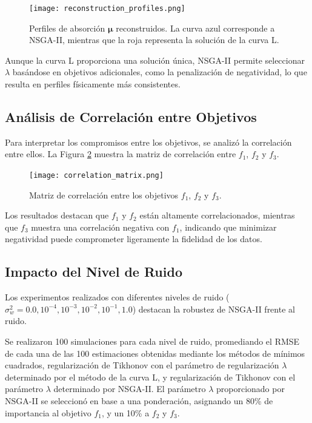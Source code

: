 \begin{figure}[h]
    \centering
    \texttt{[image: reconstruction\_profiles.png]}
    \caption{Perfiles de absorción \( \mathbf{\mu} \) reconstruidos. La curva azul corresponde a NSGA-II, mientras que la roja representa la solución de la curva L.}
    \label{fig:reconstruction_profiles}
\end{figure}

Aunque la curva L proporciona una solución única, NSGA-II permite seleccionar \( \lambda \) basándose en objetivos adicionales, como la penalización de negatividad, lo que resulta en perfiles físicamente más consistentes.

\subsection{Análisis de Correlación entre Objetivos} \label{sec:results:correlation}

Para interpretar los compromisos entre los objetivos, se analizó la correlación entre ellos. La Figura \ref{fig:correlation_matrix} muestra la matriz de correlación entre \( f_1 \), \( f_2 \) y \( f_3 \).

\begin{figure}[h]
    \centering
    \texttt{[image: correlation\_matrix.png]}
    \caption{Matriz de correlación entre los objetivos \( f_1 \), \( f_2 \) y \( f_3 \).}
    \label{fig:correlation_matrix}
\end{figure}

Los resultados destacan que \( f_1 \) y \( f_2 \) están altamente correlacionados, mientras que \( f_3 \) muestra una correlación negativa con \( f_1 \), indicando que minimizar negatividad puede comprometer ligeramente la fidelidad de los datos.

\subsection{Impacto del Nivel de Ruido} \label{sec:results:noise}

Los experimentos realizados con diferentes niveles de ruido (\( \sigma_{w}^{2} = 0.0, 10^{-4}, 10^{-3}, 10^{-2}, 10^{-1}, 1.0 \)) destacan la robustez de NSGA-II frente al ruido.

Se realizaron 100 simulaciones para cada nivel de ruido, promediando el RMSE de cada una de las 100 estimaciones obtenidas mediante los métodos de mínimos cuadrados, regularización de Tikhonov con el parámetro de regularización $\lambda$ determinado por el método de la curva L, y regularización de Tikhonov con el parámetro $\lambda$ determinado por NSGA-II. El parámetro $\lambda$ proporcionado por NSGA-II se seleccionó en base a una ponderación, asignando un 80\% de importancia al objetivo $f_1$, y un 10\% a $f_2$ y $f_3$.

